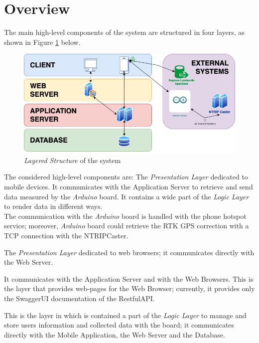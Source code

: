 \section{Overview}
The main high-level components of the system are structured in four layers, as shown in Figure \ref{img:archi_layers} below.

\begin{figure}[H]
\begin{center}
  \includegraphics[width=\textwidth]{img/archi/layers.png}
  \hspace{0.05\linewidth}
  \centering
  \caption{\textit{Layered Structure} of the system}
  \label{img:archi_layers}
\end{center}
\end{figure}
\clearpage

The considered high-level components are:
The \textit{Presentation Layer} dedicated to mobile devices. It communicates with the Application Server to retrieve and send data measured by the \textit{Arduino} board. It contains a wide part of the \textit{Logic Layer} to render data in different ways.\\
The communication with the \textit{Arduino} board is handled with the phone hotspot service; moreover, \textit{Arduino} board could retrieve the RTK GPS correction with a TCP connection with the NTRIPCaster.
  
The \textit{Presentation Layer} dedicated to web browsers; it communicates directly with the Web Server.
  
It communicates with the Application Server and with the Web Browsers. This is the layer that provides web-pages for the Web Browser; currently, it provides only the SwaggerUI documentation of the RestfulAPI.
  
This is the layer in which is contained a part of the \textit{Logic Layer} to manage and store users information and collected data with the board; it communicates directly with the Mobile Application, the Web Server and the Database.
  
